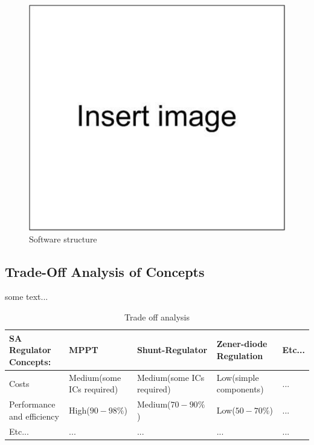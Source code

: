 \begin{figure}[bht]
\centering
\includegraphics[scale=0.5]{figures/Drawing1}
\caption{Software structure}
\label{fig:some_reference}
\end{figure}


\subsection{Trade-Off Analysis of Concepts}

some text...

\begin{center}
\begin{table}[bht]
\begin{tabular}{||m{}m{}m{}m{}l||}
\hline\hline
\textbf{SA Regulator Concepts:} &  \textbf{MPPT} & \textbf{Shunt-Regulator} & \textbf{Zener-diode Regulation} & \textbf{Etc...}\\ 
\hline
Costs & Medium(some ICs required) & Medium(some ICs required) & Low(simple components) & ... \\
Performance and efficiency & High($90-98\%$) & Medium($70-90\%$) & Low($50-70\%$) & ... \\
Etc... & ... & ... & ... & ... \\
\hline
\end{tabular}
\caption{Trade off analysis}
\label{tab:TradeOff}
\end{table}
\end{center}



